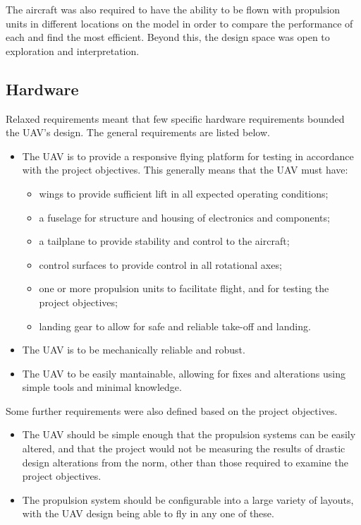 \documentclass[../../main.tex]{subfiles}
\begin{document}
The aircraft was also required to have the ability to be flown with propulsion units in different locations on the model in order to compare the performance of each and find the most efficient. 
Beyond this, the design space was open to exploration and interpretation. 

\subsection{Hardware} \label{sec:design-specification:requirements:hardware}

Relaxed requirements meant that few specific hardware requirements bounded the UAV's design.
The general requirements are listed below.

\begin{itemize}
    \item The UAV is to provide a responsive flying platform for testing in accordance with the project objectives.
        This generally means that the UAV must have:
        \begin{itemize}
            \item wings to provide sufficient lift in all expected operating conditions;
            \item a fuselage for structure and housing of electronics and components;
            \item a tailplane to provide stability and control to the aircraft;
            \item control surfaces to provide control in all rotational axes;
            \item one or more propulsion units to facilitate flight, and for testing the project objectives;
            \item landing gear to allow for safe and reliable take-off and landing.
        \end{itemize}
    \item The UAV is to be mechanically reliable and robust.
    \item The UAV to be easily mantainable, allowing for fixes and alterations using simple tools and minimal knowledge.
\end{itemize}

Some further requirements were also defined based on the project objectives.

\begin{itemize}
    \item The UAV should be simple enough that the propulsion systems can be easily altered, and that the project would not be measuring the results of drastic design alterations from the norm, other than those required to examine the project objectives.
    \item The propulsion system should be configurable into a large variety of layouts, with the UAV design being able to fly in any one of these. 
\end{itemize}
\end{document}
